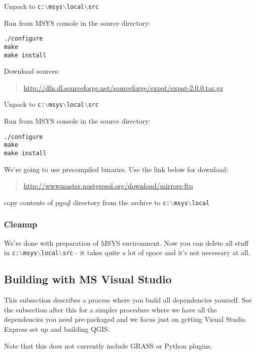 Unpack to \texttt{c:$\backslash$msys$\backslash$local$\backslash$src}

Run from MSYS console in the source directory:

\begin{verbatim}
./configure
make
make install
\end{verbatim}

\hypertarget{toc72}{}
Download sources:

	\begin{quotation}
\url{http://dfn.dl.sourceforge.net/sourceforge/expat/expat-2.0.0.tar.gz}
	\end{quotation}

Unpack to \texttt{c:$\backslash$msys$\backslash$local$\backslash$src}

Run from MSYS console in the source directory:

\begin{verbatim}
./configure
make
make install
\end{verbatim}

\hypertarget{toc73}{}
We're going to use precompiled binaries. Use the link below for download:

	\begin{quotation}
\url{http://wwwmaster.postgresql.org/download/mirrors-ftp}
	\end{quotation}

copy contents of pgsql directory from the archive to \texttt{c:$\backslash$msys$\backslash$local}

\hypertarget{toc74}{}
\subsubsection{Cleanup}
We're done with preparation of MSYS environment. Now you can delete all stuff in \texttt{c:$\backslash$msys$\backslash$local$\backslash$src} - it takes quite a lot
of space and it's not necessary at all.


\hypertarget{toc75}{}
\subsection{Building with MS Visual Studio}
This subsection describes a process where you build all dependencies yourself. See the subsection
after this for a simpler procedure where we have all the dependencies you need pre-packaged
and we focus just on getting Visual Studio Express set up and building QGIS.

Note that this does not currently include GRASS or Python plugins.

